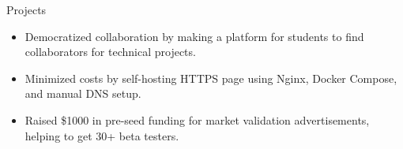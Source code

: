 \documentclass{resume} %
\begin{document}
\begin{workSection}{Projects}
	
	
	\customItem[
	title=\href{https://github.com/AshkanArabim/hackerhunt}{hackerhunt.tech },
	technologies= | Django{,} React{,} TypeScript{,} Nginx{,} Docker{,} AWS SES,
	duration=%
	]
	\begin{itemize}
		\vspace{-0.5em}
		\itemsep -6pt {}
		\item Democratized collaboration by making a platform for students to find collaborators for technical projects. 
		\item Minimized costs by self-hosting HTTPS page using {Nginx}, {Docker Compose}, and manual DNS setup.
		\item Raised {\$1000 in pre-seed funding} for market validation advertisements, helping to get {30+ beta testers}. %
	\end{itemize}
	

\end{workSection}
\end{document}
